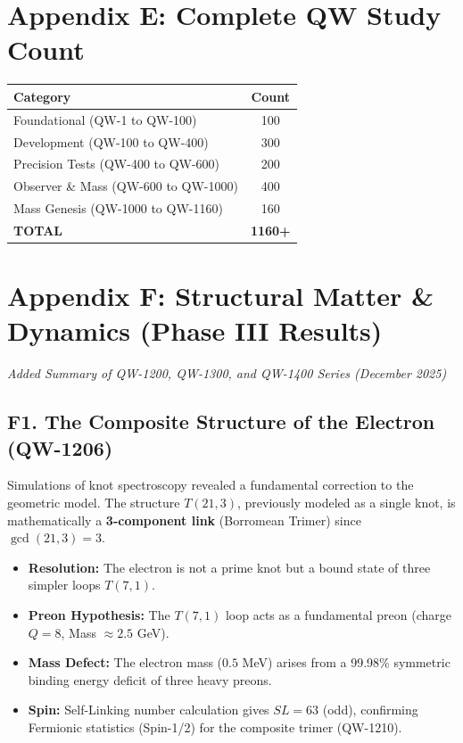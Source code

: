 \documentclass[11pt, a4paper]{article}
\theoremstyle{remark}
\begin{document}
\section{Appendix E: Complete QW Study Count}

\begin{center}
\begin{tabular}{|l|c|}
\hline
\textbf{Category} & \textbf{Count} \\
\hline
Foundational (QW-1 to QW-100) & 100 \\
Development (QW-100 to QW-400) & 300 \\
Precision Tests (QW-400 to QW-600) & 200 \\
Observer \& Mass (QW-600 to QW-1000) & 400 \\
Mass Genesis (QW-1000 to QW-1160) & 160 \\
\hline
\textbf{TOTAL} & \textbf{1160+} \\
\hline
\end{tabular}
\end{center}

\section{Appendix F: Structural Matter \& Dynamics (Phase III Results)}

\textit{Added Summary of QW-1200, QW-1300, and QW-1400 Series (December 2025)}

\subsection{F1. The Composite Structure of the Electron (QW-1206)}
Simulations of knot spectroscopy revealed a fundamental correction to the geometric model. The structure $T(21,3)$, previously modeled as a single knot, is mathematically a \textbf{3-component link} (Borromean Trimer) since $\gcd(21,3)=3$.
\begin{itemize}
    \item \textbf{Resolution:} The electron is not a prime knot but a bound state of three simpler loops $T(7,1)$.
    \item \textbf{Preon Hypothesis:} The $T(7,1)$ loop acts as a fundamental preon (charge $Q=8$, Mass $\approx 2.5$ GeV).
    \item \textbf{Mass Defect:} The electron mass ($0.5$ MeV) arises from a 99.98\% symmetric binding energy deficit of three heavy preons.
    \item \textbf{Spin:} Self-Linking number calculation gives $SL=63$ (odd), confirming Fermionic statistics (Spin-1/2) for the composite trimer (QW-1210).
\end{itemize}
\end{document}
